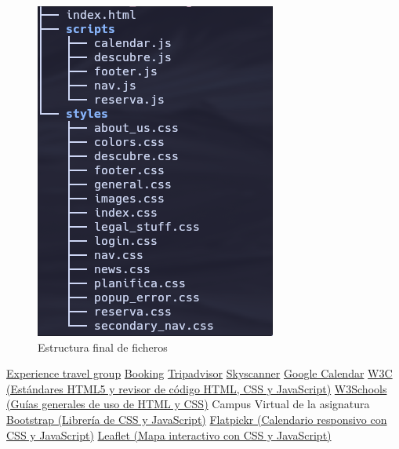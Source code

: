 \documentclass[11pt, a4paper]{book}
\begin{document}
\begin{figure} [h]
\begin{minipage}[c]{0.25\textwidth}
		\end{minipage}
		\begin{minipage}[c]{0.25\textwidth}
			\centering
			\includegraphics[width=\textwidth]{estructura_ficheros_final3.png}
		\end{minipage}
		\caption{Estructura final de ficheros}
	\end{figure}

	\begin{thebibliography}{9}
		 \href{https://experiencetravelgroup.com}{Experience travel group}
		 \href{https://booking.com}{Booking}
		 \href{https://tripadvisor.es}{Tripadvisor}
		 \href{https://skyscanner.es}{Skyscanner}
		 \href{https://calendar.google.com/calendar/u/0/r}{Google Calendar}
		 \href{https://html.spec.whatwg.org/multipage/}{W3C (Estándares HTML5 y revisor de código HTML, CSS y JavaScript)}
		 \href{https://www.w3schools.com/}{W3Schools (Guías generales de uso de HTML y CSS)} 
		 Campus Virtual de la asignatura
		 \href{https://getbootstrap.com/}{Bootstrap (Librería de CSS y JavaScript)}
		 \href{https://flatpickr.js.org/}{Flatpickr (Calendario responsivo con CSS y JavaScript)}
         \href{https://leafletjs.com/}{Leaflet (Mapa interactivo con CSS y JavaScript)}
	\end{thebibliography}
\end{document}

